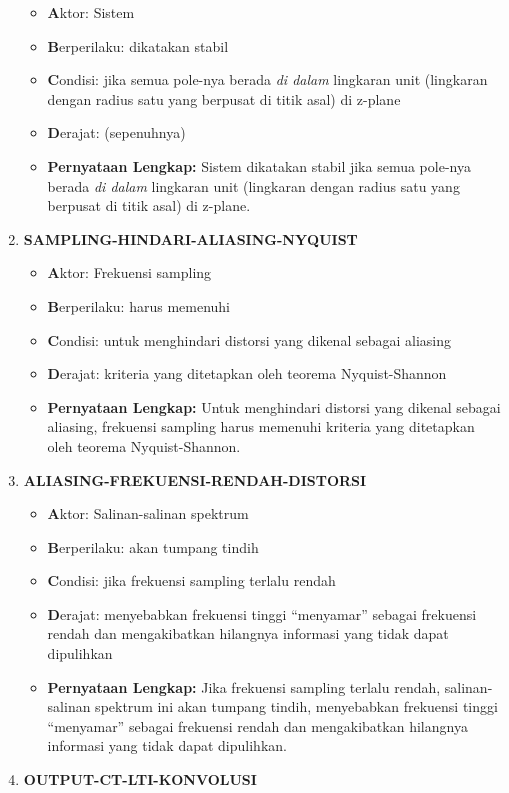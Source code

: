 \documentclass[
  letterpaper,
  DIV=11,
  numbers=noendperiod]{scrreprt}
\begin{document}
\begin{enumerate}
  \begin{itemize}
  \item
    \textbf{A}ktor: Sistem
  \item
    \textbf{B}erperilaku: dikatakan stabil
  \item
    \textbf{C}ondisi: jika semua pole-nya berada \emph{di dalam}
    lingkaran unit (lingkaran dengan radius satu yang berpusat di titik
    asal) di z-plane
  \item
    \textbf{D}erajat: (sepenuhnya)
  \item
    \textbf{Pernyataan Lengkap:} Sistem dikatakan stabil jika semua
    pole-nya berada \emph{di dalam} lingkaran unit (lingkaran dengan
    radius satu yang berpusat di titik asal) di z-plane.
  \end{itemize}
\item
  \textbf{SAMPLING-HINDARI-ALIASING-NYQUIST}

  \begin{itemize}
  \item
    \textbf{A}ktor: Frekuensi sampling
  \item
    \textbf{B}erperilaku: harus memenuhi
  \item
    \textbf{C}ondisi: untuk menghindari distorsi yang dikenal sebagai
    aliasing
  \item
    \textbf{D}erajat: kriteria yang ditetapkan oleh teorema
    Nyquist-Shannon
  \item
    \textbf{Pernyataan Lengkap:} Untuk menghindari distorsi yang dikenal
    sebagai aliasing, frekuensi sampling harus memenuhi kriteria yang
    ditetapkan oleh teorema Nyquist-Shannon.
  \end{itemize}
\item
  \textbf{ALIASING-FREKUENSI-RENDAH-DISTORSI}

  \begin{itemize}
  \item
    \textbf{A}ktor: Salinan-salinan spektrum
  \item
    \textbf{B}erperilaku: akan tumpang tindih
  \item
    \textbf{C}ondisi: jika frekuensi sampling terlalu rendah
  \item
    \textbf{D}erajat: menyebabkan frekuensi tinggi ``menyamar'' sebagai
    frekuensi rendah dan mengakibatkan hilangnya informasi yang tidak
    dapat dipulihkan
  \item
    \textbf{Pernyataan Lengkap:} Jika frekuensi sampling terlalu rendah,
    salinan-salinan spektrum ini akan tumpang tindih, menyebabkan
    frekuensi tinggi ``menyamar'' sebagai frekuensi rendah dan
    mengakibatkan hilangnya informasi yang tidak dapat dipulihkan.
  \end{itemize}
\item
  \textbf{OUTPUT-CT-LTI-KONVOLUSI}


\end{enumerate}
\end{document}
